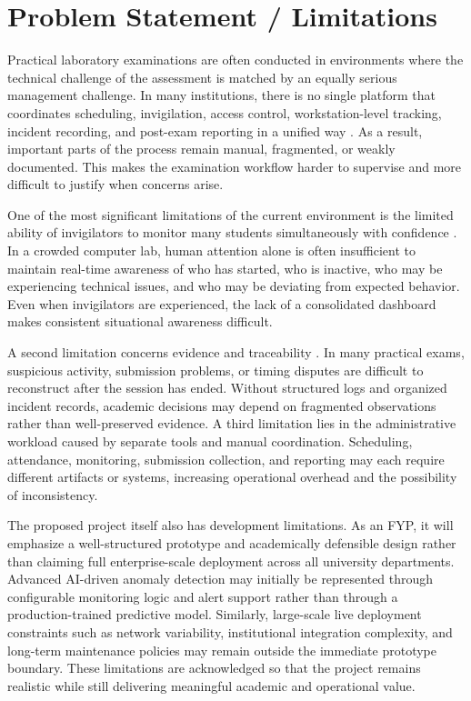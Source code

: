 \section{Problem Statement / Limitations}

Practical laboratory examinations are often conducted in environments where the technical challenge of the assessment is matched by an equally serious management challenge. In many institutions, there is no single platform that coordinates scheduling, invigilation, access control, workstation-level tracking, incident recording, and post-exam reporting in a unified way \cite{pmc_cbt}. As a result, important parts of the process remain manual, fragmented, or weakly documented. This makes the examination workflow harder to supervise and more difficult to justify when concerns arise.

One of the most significant limitations of the current environment is the limited ability of invigilators to monitor many students simultaneously with confidence \cite{mit_cbt}. In a crowded computer lab, human attention alone is often insufficient to maintain real-time awareness of who has started, who is inactive, who may be experiencing technical issues, and who may be deviating from expected behavior. Even when invigilators are experienced, the lack of a consolidated dashboard makes consistent situational awareness difficult.

A second limitation concerns evidence and traceability \cite{integ1}. In many practical exams, suspicious activity, submission problems, or timing disputes are difficult to reconstruct after the session has ended. Without structured logs and organized incident records, academic decisions may depend on fragmented observations rather than well-preserved evidence. A third limitation lies in the administrative workload caused by separate tools and manual coordination. Scheduling, attendance, monitoring, submission collection, and reporting may each require different artifacts or systems, increasing operational overhead and the possibility of inconsistency.

The proposed project itself also has development limitations. As an FYP, it will emphasize a well-structured prototype and academically defensible design rather than claiming full enterprise-scale deployment across all university departments. Advanced AI-driven anomaly detection may initially be represented through configurable monitoring logic and alert support rather than through a production-trained predictive model. Similarly, large-scale live deployment constraints such as network variability, institutional integration complexity, and long-term maintenance policies may remain outside the immediate prototype boundary. These limitations are acknowledged so that the project remains realistic while still delivering meaningful academic and operational value.
